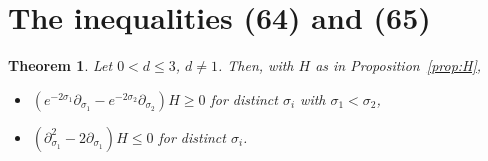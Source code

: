 \documentclass[11pt]{amsart}
\newtheorem{theorem}{Theorem}[section]
\theoremstyle{definition}
\numberwithin{equation}{section}
\begin{document}
\section{The inequalities (64) and (65)}\label{sec:6465}

\begin{theorem}\label{thm:6465}
Let $0<d\le3$, $d\ne1$. Then, with $H$ as in Proposition~\ref{prop:H},
\begin{itemize}
\item[(b)] $(e^{-2\sigma_1}\partial_{\sigma_1}-e^{-2\sigma_2}\partial_{\sigma_2})H\ge0$ for distinct $\sigma_i$ with $\sigma_1<\sigma_2$,
\item[(c)] $(\partial_{\sigma_1}^2-2\partial_{\sigma_1})H\le0$ for distinct $\sigma_i$.
\end{itemize}
\end{theorem}
\end{document}
